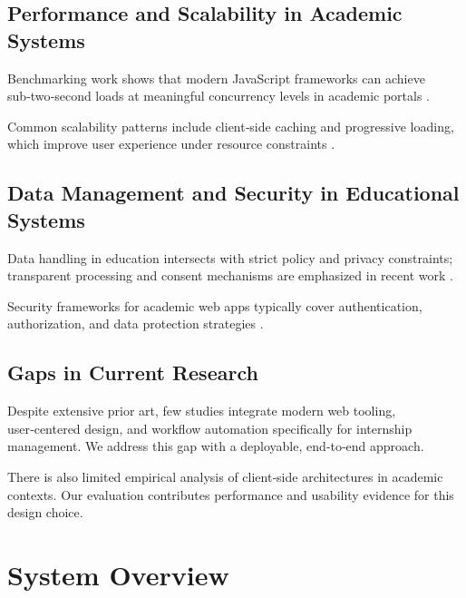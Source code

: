 \documentclass[conference]{IEEEtran}
\begin{document}
\subsection{Performance and Scalability in Academic Systems}
Benchmarking work shows that modern JavaScript frameworks can achieve sub‑two‑second loads at meaningful concurrency levels in academic portals \cite{zhang2023performance}.

Common scalability patterns include client‑side caching and progressive loading, which improve user experience under resource constraints \cite{oconnor2023scalability}.

\subsection{Data Management and Security in Educational Systems}
Data handling in education intersects with strict policy and privacy constraints; transparent processing and consent mechanisms are emphasized in recent work \cite{taylor2023privacy}.

Security frameworks for academic web apps typically cover authentication, authorization, and data protection strategies \cite{rodriguez2023security}.

\subsection{Gaps in Current Research}
Despite extensive prior art, few studies integrate modern web tooling, user‑centered design, and workflow automation specifically for internship management. We address this gap with a deployable, end‑to‑end approach.

There is also limited empirical analysis of client‑side architectures in academic contexts. Our evaluation contributes performance and usability evidence for this design choice.

\section{System Overview}
\end{document}
